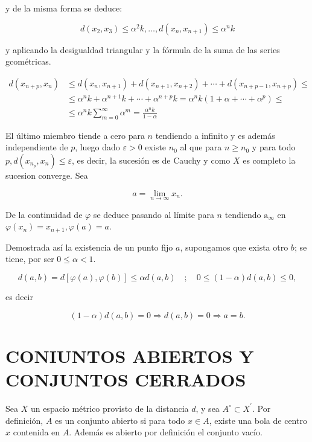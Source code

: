 \documentclass[10pt]{article}
\theoremstyle{plain}
\theoremstyle{definition}
\theoremstyle{remark}
\begin{document}
y de la misma forma se deduce:

$$
d\left(x_{2}, x_{3}\right) \leqslant \alpha^{2} k, \ldots, d\left(x_{n}, x_{n+1}\right) \leqslant \alpha^{n} k
$$

y aplicando la desigualdad triangular y la fórmula de la suma de las series gcométricas.

$$
\begin{aligned}
d\left(x_{n+p}, x_{n}\right) & \leqslant d\left(x_{n}, x_{n+1}\right)+d\left(x_{n+1}, x_{n+2}\right)+\cdots+d\left(x_{n+p-1}, x_{n+p}\right) \leqslant \\
& \leqslant \alpha^{n} k+\alpha^{n+1} k+\cdots+\alpha^{n+p} k=\alpha^{n} k\left(1+\alpha+\cdots+\alpha^{p}\right) \leqslant \\
& \leqslant \alpha^{n} k \sum_{m=0}^{\infty} \alpha^{m}=\frac{\alpha^{n} k}{1-\alpha}
\end{aligned}
$$

El último miembro tiende a cero para $n$ tendiendo a infinito y es además independiente de $p$, luego dado $\varepsilon>0$ existe $n_{0}$ al que para $n \geqslant n_{0}$ y para todo $p, d\left(x_{n_{p}}, x_{n}\right) \leqslant \varepsilon$, es decir, la sucesión es de Cauchy y como $X$ es completo la sucesion converge. Sea

$$
a=\lim _{n \rightarrow \infty} x_{n} .
$$

De la continuidad de $\varphi$ se deduce pasando al límite para $n$ tendiendo $\mathrm{a}_{\infty}$ en $\varphi\left(x_{n}\right)=x_{n+1}, \varphi(a)=a$.

Demostrada así la existencia de un punto fijo $a$, supongamos que exista otro $b$; se tiene, por ser $0 \leqslant \alpha<1$.

$$
d(a, b)=d[\varphi(a), \varphi(b)] \leqslant \alpha d(a, b) \quad ; \quad 0 \leqslant(1-\alpha) d(a, b) \leqslant 0,
$$

es decir

$$
(1-\alpha) d(a, b)=0 \Rightarrow d(a, b)=0 \Rightarrow a=b .
$$

\section*{CONIUNTOS ABIERTOS Y CONJUNTOS CERRADOS}
Sea $X$ un espacio métrico provisto de la distancia $d$, y sea $A^{\circ} \subset X^{\prime}$. Por definición, $A$ es un conjunto abierto si para todo $x \in A$, existe una bola de centro $x$ contenida en $A$. Además es abierto por definición el conjunto vacío.
\end{document}
